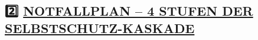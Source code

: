 \hypertarget{section}{%
\subsection{}\label{section}}

\hypertarget{section-1}{%
\subsection{}\label{section-1}}

\hypertarget{notfallplan-4-stufen-der-selbstschutz-kaskade}{%
\subsection{\texorpdfstring{\textbf{2️⃣ \ul{NOTFALLPLAN -- 4 STUFEN DER SELBSTSCHUTZ-KASKADE}}}{2️⃣ NOTFALLPLAN -- 4 STUFEN DER SELBSTSCHUTZ-KASKADE}}\label{notfallplan-4-stufen-der-selbstschutz-kaskade}}

